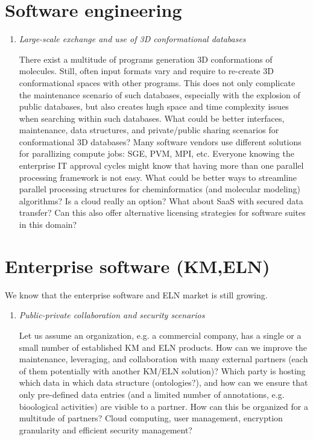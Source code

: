 \documentclass{sig-alternate}
\begin{document}
\section*{Software engineering}
\begin{enumerate}
\item \emph{Large-scale exchange and use of 3D conformational databases}

There exist a multitude of programs generation 3D conformations of molecules. Still, often input formats vary and require
to re-create 3D conformational spaces with other programs. This does not only complicate the maintenance scenario of such
databases, especially with the explosion of public databases, but also creates hugh space and time complexity issues when
searching within such databases. What could be better interfaces, maintenance, data structures, and private/public sharing
scenarios for conformational 3D databases? 
Many software vendors use different solutions for parallizing compute jobs: SGE, PVM, MPI, etc. 
Everyone knowing the enterprise IT approval cycles might know that having more than one parallel processing framework 
is not easy. What could be better ways to streamline parallel processing structures for 
cheminformatics (and molecular modeling) algorithms? Is a cloud really an option? What about SaaS with secured data transfer?
Can this also offer alternative licensing strategies for software suites in this domain?
\end{enumerate}

\section*{Enterprise software (KM,ELN)}
We know that the enterprise software and ELN market is still growing.
\begin{enumerate}
\item \emph{Public-private collaboration and security scenarios}

Let us assume an organization, e.g. a commercial company, has a single or a small number of established KM and ELN products. 
How can we improve the maintenance, leveraging, and collaboration with many external partners (each of them potentially
with another KM/ELN solution)? Which party is hosting which data in which data structure (ontologies?), and 
how can we ensure that only pre-defined data entries 
(and a limited number of annotations, e.g. bioological activities) are visible to a partner.
How can this be organized for a multitude of partners? Cloud computing, user management, encryption granularity and efficient security management?
\end{enumerate}



\end{document}
